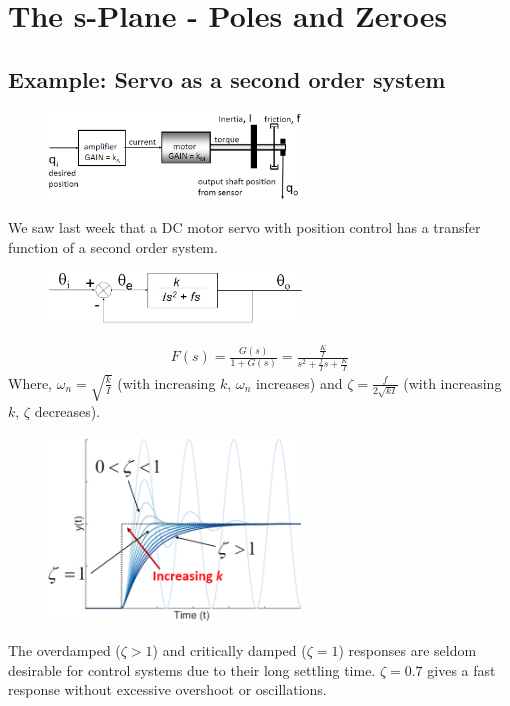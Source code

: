 \documentclass[class=report, crop=false, 12pt,a4paper]{standalone}
\begin{document}
\section{The s-Plane - Poles and Zeroes}
\subsection{Example: Servo as a second order system}
\begin{figure}[H]
  \centering
  \includegraphics[width = 0.6\textwidth]{../img/diagram87.png}
  \caption{}
\end{figure}
We saw last week that a DC motor servo with position control has a transfer function of a second order system.
\begin{figure}[H]
  \centering
  \includegraphics[width = 0.6\textwidth]{../img/diagram88.png}
  \caption{}
\end{figure}
\begin{align}
  F(s) = \frac{G(s)}{1+G(s)} = \frac{\frac{K}{I}}{s^2 + \frac{f}{I}s + \frac{K}{I}}
\end{align}
Where, $\omega_n = \sqrt{\frac{k}{I}}$ (with increasing $k$, $\omega_n$ increases) and $\zeta = \frac{f}{2\sqrt{kI}}$ (with increasing $k$, $\zeta$ decreases).
\begin{figure}[H]
  \centering
  \includegraphics[width = 0.6\textwidth]{../img/diagram89.png}
  \caption{}
\end{figure}
The overdamped ($\zeta > 1$) and critically damped ($\zeta = 1$) responses are seldom desirable for control systems due to their long settling time. $\zeta = 0.7$ gives a fast response without excessive overshoot or oscillations.
\end{document}

